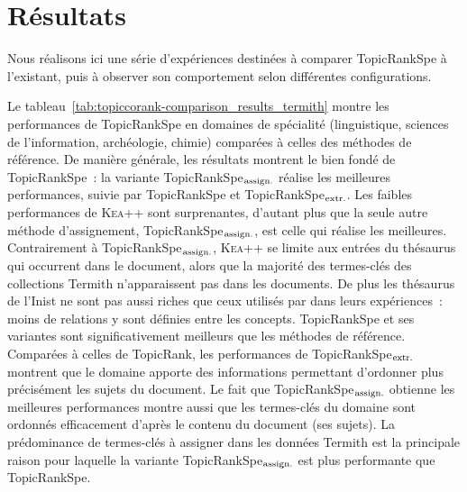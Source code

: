 \section{Résultats}
\label{sec:main-domain_specific_keyphrase_annotation-supervised_automatic_keyphrase_annotation-evaluation-topiccorank_specific_domains}
  Nous réalisons ici une série d'expériences destinées à comparer
  TopicRankSpe à l'existant, puis à observer son comportement selon
  différentes configurations.

  Le tableau~\ref{tab:topiccorank-comparison_results_termith} montre les
  performances de TopicRankSpe en domaines de spécialité (linguistique,
  sciences de l'information, archéologie, chimie) comparées à celles des
  méthodes de référence. De manière générale, les résultats montrent le
  bien fondé de TopicRankSpe~: la variante
  TopicRankSpe$_\textnormal{assign.}$ réalise les meilleures performances,
  suivie par TopicRankSpe et TopicRankSpe$_\textnormal{extr.}$. Les faibles
  performances de \textsc{Kea++} sont surprenantes, d'autant plus que la
  seule autre méthode d'assignement, TopicRankSpe$_\textnormal{assign.}$,
  est celle qui réalise les meilleures. Contrairement à
  TopicRankSpe$_\textnormal{assign.}$, \textsc{Kea++} se limite aux entrées
  du thésaurus qui occurrent dans le document, alors que la majorité des
  termes-clés des collections Termith n'apparaissent pas dans les
  documents. De plus les thésaurus de l'Inist ne sont pas aussi riches que
  ceux utilisés par  dans leurs expériences~:
  moins de relations y sont définies entre les concepts. TopicRankSpe et
  ses variantes sont significativement meilleurs que les méthodes de
  référence. Comparées à celles de TopicRank, les performances de
  TopicRankSpe$_\textnormal{extr.}$ montrent que le domaine apporte des
  informations permettant d'ordonner plus précisément les sujets du
  document. Le fait que TopicRankSpe$_\textnormal{assign.}$ obtienne les
  meilleures performances montre aussi que les termes-clés du domaine sont
  ordonnés efficacement d'après le contenu du document (ses sujets). La
  prédominance de termes-clés à assigner dans les données Termith est la
  principale raison pour laquelle la variante
  TopicRankSpe$_\textnormal{assign.}$ est plus performante que TopicRankSpe.
